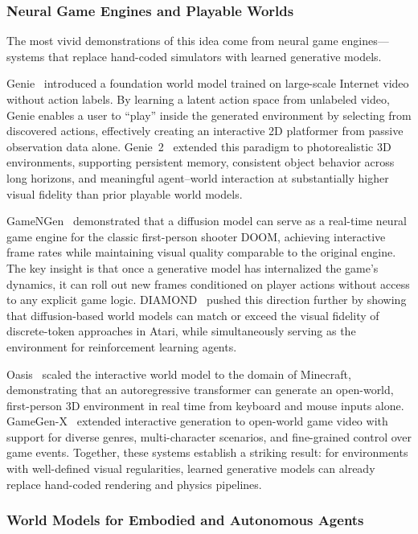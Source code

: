 \documentclass{llmxive}
\begin{document}
\subsubsection{Neural Game Engines and Playable Worlds}

The most vivid demonstrations of this idea come from neural game engines---systems that replace hand-coded simulators with learned generative models.

Genie~\citep{bruce2024genie} introduced a foundation world model trained on large-scale Internet video without action labels. By learning a latent action space from unlabeled video, Genie enables a user to ``play'' inside the generated environment by selecting from discovered actions, effectively creating an interactive 2D platformer from passive observation data alone. Genie~2~\citep{parker2024genie2} extended this paradigm to photorealistic 3D environments, supporting persistent memory, consistent object behavior across long horizons, and meaningful agent--world interaction at substantially higher visual fidelity than prior playable world models.

GameNGen~\citep{valevski2024gamenngen} demonstrated that a diffusion model can serve as a real-time neural game engine for the classic first-person shooter DOOM, achieving interactive frame rates while maintaining visual quality comparable to the original engine. The key insight is that once a generative model has internalized the game's dynamics, it can roll out new frames conditioned on player actions without access to any explicit game logic. DIAMOND~\citep{alonso2024diamond} pushed this direction further by showing that diffusion-based world models can match or exceed the visual fidelity of discrete-token approaches in Atari, while simultaneously serving as the environment for reinforcement learning agents.

Oasis~\citep{oasis2024} scaled the interactive world model to the domain of Minecraft, demonstrating that an autoregressive transformer can generate an open-world, first-person 3D environment in real time from keyboard and mouse inputs alone. GameGen-X~\citep{che2025gamegenx} extended interactive generation to open-world game video with support for diverse genres, multi-character scenarios, and fine-grained control over game events. Together, these systems establish a striking result: for environments with well-defined visual regularities, learned generative models can already replace hand-coded rendering and physics pipelines.

\subsubsection{World Models for Embodied and Autonomous Agents}
\end{document}
